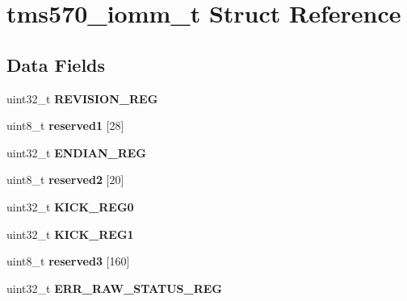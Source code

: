 \hypertarget{structtms570__iomm__t}{}\section{tms570\+\_\+iomm\+\_\+t Struct Reference}
\label{structtms570__iomm__t}
\subsection*{Data Fields}
\begin{DoxyCompactItemize}
\item 
\mbox{\label{structtms570__iomm__t_a1368b68ccb6b26e8740ff0499033bc34}} 
uint32\+\_\+t {\bfseries R\+E\+V\+I\+S\+I\+O\+N\+\_\+\+R\+EG}
\item 
\mbox{\label{structtms570__iomm__t_a95d07d7c4c414208aa868674f0445edd}} 
uint8\+\_\+t {\bfseries reserved1} \mbox{[}28\mbox{]}
\item 
\mbox{\label{structtms570__iomm__t_aef60132f355e1e8a0645f79b86b11b38}} 
uint32\+\_\+t {\bfseries E\+N\+D\+I\+A\+N\+\_\+\+R\+EG}
\item 
\mbox{\label{structtms570__iomm__t_ae25e495dfb03172626cef6b4701301dc}} 
uint8\+\_\+t {\bfseries reserved2} \mbox{[}20\mbox{]}
\item 
\mbox{\label{structtms570__iomm__t_a523dead50cb3c030b68455400cb2f8ef}} 
uint32\+\_\+t {\bfseries K\+I\+C\+K\+\_\+\+R\+E\+G0}
\item 
\mbox{\label{structtms570__iomm__t_a5096fc026a208f333781e47993930635}} 
uint32\+\_\+t {\bfseries K\+I\+C\+K\+\_\+\+R\+E\+G1}
\item 
\mbox{\label{structtms570__iomm__t_acce636aaac5571ba4e6731679c63da52}} 
uint8\+\_\+t {\bfseries reserved3} \mbox{[}160\mbox{]}
\item 
\mbox{\label{structtms570__iomm__t_a2041b4cca90d6107ca4c161baea1efa4}} 
uint32\+\_\+t {\bfseries E\+R\+R\+\_\+\+R\+A\+W\+\_\+\+S\+T\+A\+T\+U\+S\+\_\+\+R\+EG}
\item 
\mbox{\label{structtms570__iomm__t_a38bc83dea1068a5a18ec2572c725b10e}} 

\end{DoxyCompactItemize}
